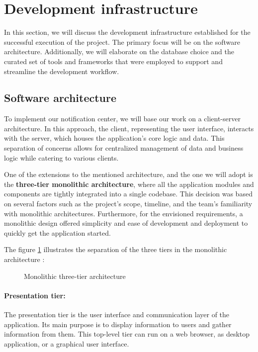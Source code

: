 \section{Development infrastructure}
In this section, we will discuss the development infrastructure established for the successful execution
of the project. The primary focus will be on the software architecture. Additionally, we will elaborate
on the database choice and the curated set of tools and frameworks that were employed to support and
streamline the development workflow.


\subsection{Software architecture}
To implement our notification center, we will base our work on a client-server architecture.
In this approach, the client, representing the user interface, interacts with the server, which houses
the application's core logic and data. This separation of concerns allows for centralized management
of data and business logic while catering to various clients.

One of the extensions to the mentioned architecture, and the one we will adopt is
the \textbf{three-tier monolithic architecture}, where all the application modules and components
are tightly integrated into a single codebase. This decision was based on several factors such as
the project's scope, timeline, and the team's familiarity with monolithic architectures.
Furthermore, for the envisioned requirements, a monolithic design offered simplicity and ease
of development and deployment to quickly get the application started.

\noindent The figure \ref{monolithic} illustrates the separation of the three tiers in the monolithic architecture : \\

\begin{figure}[hbt!]
      \centering
      
      \caption{Monolithic three-tier architecture}
      \label{monolithic}
\end{figure}

\paragraph{Presentation tier:}
The presentation tier is the user interface and communication layer of the application. Its main purpose
is to display information to users and gather information from them. This top-level tier can run on a web
browser, as desktop application, or a graphical user interface.

